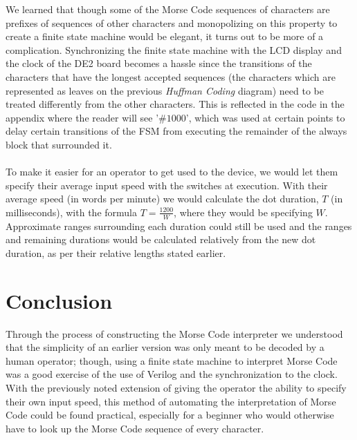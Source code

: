 \documentclass[12pt, letterpaper, english]{article}
\begin{document}
\indent We learned that though some of the Morse Code sequences of characters are prefixes of sequences of other characters and monopolizing on this property to create a finite state machine would be elegant, it turns out to be more of a complication. Synchronizing the finite state machine with the LCD display and the clock of the DE2 board becomes a hassle since the transitions of the characters that have the longest accepted sequences (the characters which are represented as leaves on the previous \textit{Huffman Coding} diagram) need to be treated differently from the other characters. This is reflected in the code in the appendix where the reader will see '$\#1000$', which was used at certain points to delay certain transitions of the FSM from executing the remainder of the always block that surrounded it.\\\\
\indent To make it easier for an operator to get used to the device, we would let them specify their average input speed with the switches at execution. With their average speed (in words per minute) we would calculate the dot duration, $T$ (in milliseconds), with the formula $T = \frac{1200}{W}$, where they would be specifying $W$. Approximate ranges surrounding each duration could still be used and the ranges and remaining durations would be calculated relatively from the new dot duration, as per their relative lengths stated earlier.
\section*{Conclusion}
\indent\indent Through the process of constructing the Morse Code interpreter we understood that the simplicity of an earlier version was only meant to be decoded by a human operator; though, using a finite state machine to interpret Morse Code was a good exercise of the use of Verilog and the synchronization to the clock. With the previously noted extension of giving the operator the ability to specify their own input speed, this method of automating the interpretation of Morse Code could be found practical, especially for a beginner who would otherwise have to look up the Morse Code sequence of every character.
\newpage
\end{document}
